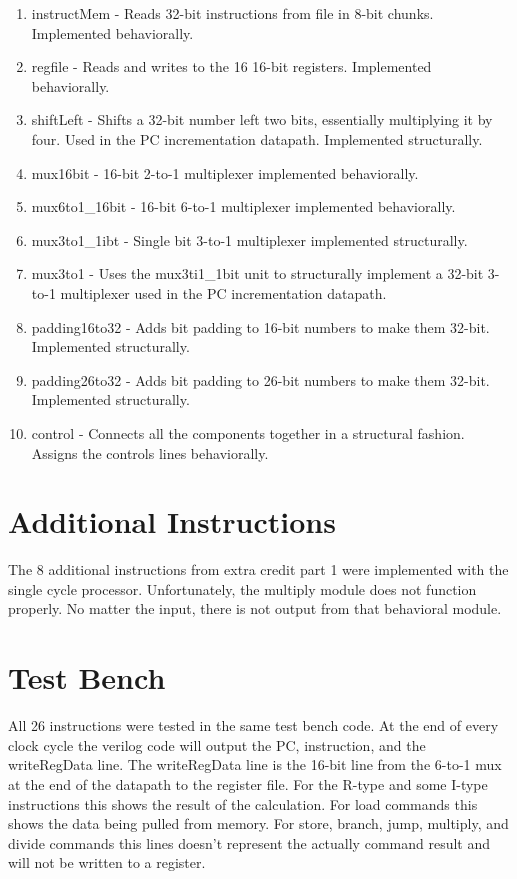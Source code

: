 \documentclass[11pt]{article}
\begin{document}
\begin{enumerate}
      \item instructMem - Reads 32-bit instructions from file in 8-bit chunks. Implemented behaviorally.
      \item regfile - Reads and writes to the 16 16-bit registers. Implemented behaviorally.
      \item shiftLeft - Shifts a 32-bit number left two bits, essentially multiplying it by four. Used in the PC incrementation datapath. Implemented structurally.
      \item mux16bit - 16-bit 2-to-1 multiplexer implemented behaviorally.
      \item mux6to1\_16bit - 16-bit 6-to-1 multiplexer implemented behaviorally.
      \item mux3to1\_1ibt - Single bit 3-to-1 multiplexer implemented structurally.
      \item mux3to1 - Uses the mux3ti1\_1bit unit to structurally implement a 32-bit 3-to-1 multiplexer used in the PC incrementation datapath.
      \item padding16to32 - Adds bit padding to 16-bit numbers to make them 32-bit. Implemented structurally.
      \item padding26to32 - Adds bit padding to 26-bit numbers to make them 32-bit. Implemented structurally.
      \item control - Connects all the components together in a structural fashion. Assigns the controls lines behaviorally.
  \end{enumerate}

  \section{Additional Instructions}

  The 8 additional instructions from extra credit part 1 were implemented with the single cycle processor. Unfortunately, the multiply module does not function properly. No matter the input, there is not output from that behavioral module.

  \section{Test Bench}

  All 26 instructions were tested in the same test bench code. At the end of every clock cycle the verilog code will output the PC, instruction, and the writeRegData line. The writeRegData line is the 16-bit line from the 6-to-1 mux at the end of the datapath to the register file. For the R-type and some I-type instructions this shows the result of the calculation. For load commands this shows the data being pulled from memory. For store, branch, jump, multiply, and divide commands this lines doesn't represent the actually command result and will not be written to a register.
\end{document}
